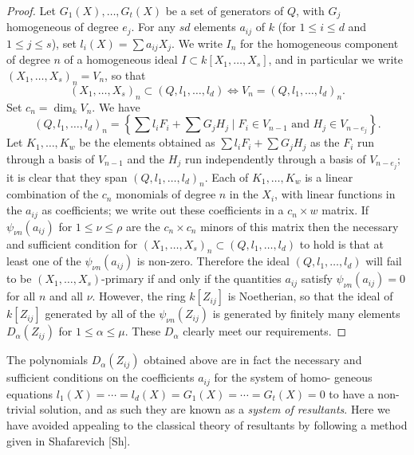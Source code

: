 \begin{proof}
Let $G_1(X), \ldots, G_t(X)$ be a set of generators of $Q$, with $G_j$ homogeneous
of degree $e_j$. For any $sd$ elements $a_{ij}$ of $k$ (for $1 \le i \le d$ and $1 \le j \le s$), set
$l_i(X) = \sum a_{ij}X_j$. We write $I_n$ for the homogeneous component of degree $n$
of a homogeneous ideal $I \subset k[X_1, \ldots, X_s]$, and in particular we write
$(X_1, \ldots, X_s)_n = V_n$, so that
\[
  (X_1, \ldots, X_s)_n \subset (Q, l_1, \ldots, l_d) \iff V_n = (Q, l_1, \ldots, l_d)_n.
\]
Set $c_n = \dim_k V_n$. We have
\[
  (Q, l_1, \ldots, l_d)_n = \left\{\sum l_iF_i + \sum G_jH_j \mid F_i \in V_{n-1} \text{ and } H_j \in V_{n-e_j}\right\}.
\]
Let $K_1, \ldots, K_w$ be the elements obtained as $\sum l_iF_i + \sum G_jH_j$ as the $F_i$ run
through a basis of $V_{n-1}$ and the $H_j$ run independently through a basis
of $V_{n-e_j}$; it is clear that they span $(Q, l_1, \ldots, l_d)_n$. Each of $K_1, \ldots, K_w$ is a
linear combination of the $c_n$ monomials of degree $n$ in the $X_i$, with linear
functions in the $a_{ij}$ as coefficients; we write out these coefficients in a
$c_n \times w$ matrix. If $\psi_{\nu n}(a_{ij})$ for $1 \le \nu \le \rho$ are the $c_n \times c_n$ minors of this matrix
then the necessary and sufficient condition for $(X_1, \ldots, X_s)_n \subset (Q, l_1, \ldots, l_d)$ to
hold is that at least one of the $\psi_{\nu n}(a_{ij})$ is non-zero. Therefore the ideal
$(Q, l_1, \ldots, l_d)$ will fail to be $(X_1, \ldots, X_s)$-primary if and only if the
quantities $a_{ij}$ satisfy $\psi_{\nu n}(a_{ij}) = 0$ for all $n$ and all $\nu$. However, the ring $k[Z_{ij}]$
is Noetherian, so that the ideal of $k[Z_{ij}]$ generated by all of the $\psi_{\nu n}(Z_{ij})$ is
generated by finitely many elements $D_\alpha(Z_{ij})$ for $1 \le \alpha \le \mu$. These $D_\alpha$ clearly
meet our requirements.
\end{proof}

\begin{remark}
The polynomials $D_\alpha(Z_{ij})$ obtained above are in fact the necessary
and sufficient conditions on the coefficients $a_{ij}$ for the system of homo-
geneous equations $l_1(X) = \cdots = l_d(X) = G_1(X) = \cdots = G_t(X) = 0$ to have a
non-trivial solution, and as such they are known as a \emph{system of resultants}.
Here we have avoided appealing to the classical theory of resultants by
following a method given in Shafarevich [Sh].
\end{remark}

